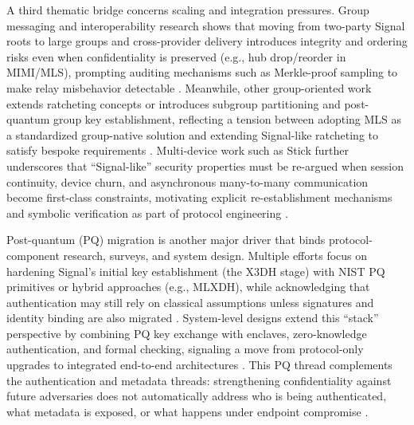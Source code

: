 A third thematic bridge concerns scaling and integration pressures. Group messaging and interoperability research shows that moving from two-party Signal roots to large groups and cross-provider delivery introduces integrity and ordering risks even when confidentiality is preserved (e.g., hub drop/reorder in MIMI/MLS), prompting auditing mechanisms such as Merkle-proof sampling to make relay misbehavior detectable \cite{sarvaiya2025,oppliger2024}. Meanwhile, other group-oriented work extends ratcheting concepts or introduces subgroup partitioning and post-quantum group key establishment, reflecting a tension between adopting MLS as a standardized group-native solution and extending Signal-like ratcheting to satisfy bespoke requirements \cite{bobrysheva2021,ayed2025,oppliger2024}. Multi-device work such as Stick further underscores that “Signal-like” security properties must be re-argued when session continuity, device churn, and asynchronous many-to-many communication become first-class constraints, motivating explicit re-establishment mechanisms and symbolic verification as part of protocol engineering \cite{basem2023}.

Post-quantum (PQ) migration is another major driver that binds protocol-component research, surveys, and system design. Multiple efforts focus on hardening Signal’s initial key establishment (the X3DH stage) with NIST PQ primitives or hybrid approaches (e.g., MLXDH), while acknowledging that authentication may still rely on classical assumptions unless signatures and identity binding are also migrated \cite{sharma2023,angom2025,boras2025}. System-level designs extend this “stack” perspective by combining PQ key exchange with enclaves, zero-knowledge authentication, and formal checking, signaling a move from protocol-only upgrades to integrated end-to-end architectures \cite{r2025}. This PQ thread complements the authentication and metadata threads: strengthening confidentiality against future adversaries does not automatically address who is being authenticated, what metadata is exposed, or what happens under endpoint compromise \cite{morales2024,bozorgi2023,jain2021}.

